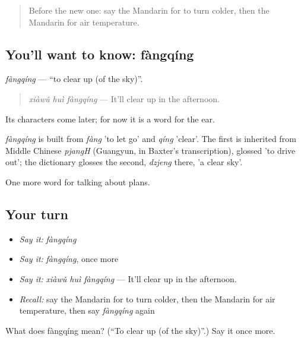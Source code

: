 \begin{quote}
Before the new one: say the Mandarin for to turn colder, then the Mandarin for air temperature.
\end{quote}

\subsection*{You'll want to know: fàngqíng}
\emph{fàngqíng} — \textquotedblleft{}to clear up (of the sky)\textquotedblright{}.

\begin{quote}
\emph{xiàwǔ huì fàngqíng} — It'll clear up in the afternoon.
\end{quote}

Its characters come later; for now it is a word for the ear.

\begin{cousinweb}
\emph{fàngqíng} is built from \emph{fàng} 'to let go' and \emph{qíng} 'clear'. The first is inherited from Middle Chinese \emph{pjangH} (Guangyun, in Baxter's transcription), glossed 'to drive out'; the dictionary glosses the second, \emph{dzjeng} there, 'a clear sky'.
\end{cousinweb}

\begin{grammarlens}[title={What you've built}]
One more word for talking about plans.
\end{grammarlens}

\subsection*{Your turn}
\begin{itemize}
\raggedright
  \item \emph{Say it:} \emph{fàngqíng}
  \item \emph{Say it:} \emph{fàngqíng}, once more
  \item \emph{Say it:} \emph{xiàwǔ huì fàngqíng} — It'll clear up in the afternoon.
  \item \emph{Recall:} say the Mandarin for to turn colder, then the Mandarin for air temperature, then say \emph{fàngqíng} again
\end{itemize}

\begin{tcolorbox}[breakable,colback=teal!4,colframe=teal!35!black,title={Before you move on}]
What does fàngqíng mean? (\textquotedblleft{}To clear up (of the sky)\textquotedblright{}.) Say it once more.
\end{tcolorbox}
